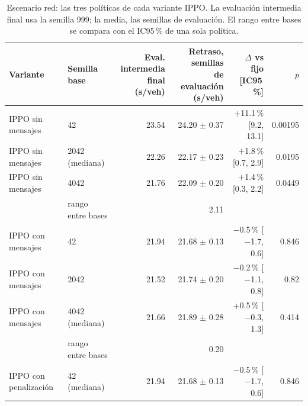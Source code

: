 \begin{table}[H]
\centering
\scriptsize
\setlength{\tabcolsep}{3pt}
\begin{tabular}{llrrrr}
\toprule
Variante & Semilla base & \makecell{Eval. intermedia\\final (s/veh)} & \makecell{Retraso, semillas\\de evaluación (s/veh)} & $\Delta$ vs fijo [IC95\,\%] & $p$ \\
\midrule
IPPO sin mensajes & 42 & 23.54 & 24.20 $\pm$ 0.37 & +11.1\,\% [9.2, 13.1] & 0.00195 \\
IPPO sin mensajes & 2042 (mediana) & 22.26 & 22.17 $\pm$ 0.23 & +1.8\,\% [0.7, 2.9] & 0.0195 \\
IPPO sin mensajes & 4042 & 21.76 & 22.09 $\pm$ 0.20 & +1.4\,\% [0.3, 2.2] & 0.0449 \\
 & rango entre bases & & 2.11 & & \\
IPPO con mensajes & 42 & 21.94 & 21.68 $\pm$ 0.13 & $-$0.5\,\% [$-$1.7, 0.6] & 0.846 \\
IPPO con mensajes & 2042 & 21.52 & 21.74 $\pm$ 0.20 & $-$0.2\,\% [$-$1.1, 0.8] & 0.82 \\
IPPO con mensajes & 4042 (mediana) & 21.66 & 21.89 $\pm$ 0.28 & +0.5\,\% [$-$0.3, 1.3] & 0.414 \\
 & rango entre bases & & 0.20 & & \\
IPPO con penalización & 42 (mediana) & 21.94 & 21.68 $\pm$ 0.13 & $-$0.5\,\% [$-$1.7, 0.6] & 0.846 \\
\bottomrule
\end{tabular}
\caption[Escenario red: fragilidad del entrenamiento IPPO]{Escenario red: las tres políticas de cada variante IPPO. La evaluación intermedia final usa la semilla 999; la media, las semillas de evaluación. El rango entre bases se compara con el IC95\,\% de una sola política.}
\label{tab:red-fragilidad}
\end{table}
